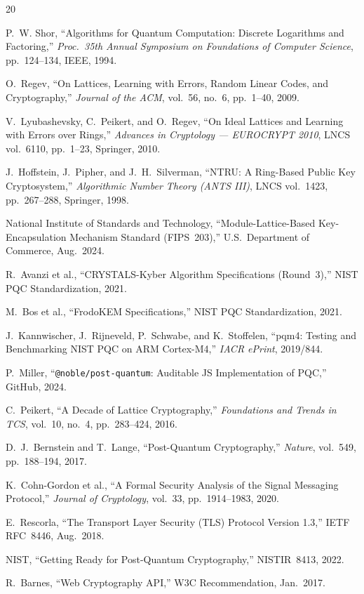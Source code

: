 \documentclass[12pt,a4paper]{report}
\begin{document}
\begin{thebibliography}{20}

P.~W. Shor, ``Algorithms for Quantum Computation: Discrete Logarithms and
Factoring,'' \textit{Proc.\ 35th Annual Symposium on Foundations of Computer
Science}, pp.~124--134, IEEE, 1994.

O.~Regev, ``On Lattices, Learning with Errors, Random Linear Codes, and
Cryptography,'' \textit{Journal of the ACM}, vol.~56, no.~6, pp.~1--40, 2009.

V.~Lyubashevsky, C.~Peikert, and O.~Regev, ``On Ideal Lattices and Learning with
Errors over Rings,'' \textit{Advances in Cryptology --- EUROCRYPT 2010},
LNCS vol.~6110, pp.~1--23, Springer, 2010.

J.~Hoffstein, J.~Pipher, and J.~H.~Silverman, ``NTRU: A Ring-Based Public Key
Cryptosystem,'' \textit{Algorithmic Number Theory (ANTS III)}, LNCS vol.~1423,
pp.~267--288, Springer, 1998.

National Institute of Standards and Technology, ``Module-Lattice-Based
Key-Encapsulation Mechanism Standard (FIPS~203),'' U.S.\ Department of Commerce,
Aug.~2024.

R.~Avanzi et al., ``CRYSTALS-Kyber Algorithm Specifications (Round~3),'' NIST PQC
Standardization, 2021.

M.~Bos et al., ``FrodoKEM Specifications,'' NIST PQC Standardization, 2021.

J.~Kannwischer, J.~Rijneveld, P.~Schwabe, and K.~Stoffelen, ``pqm4: Testing and
Benchmarking NIST PQC on ARM Cortex-M4,'' \textit{IACR ePrint}, 2019/844.

P.~Miller, ``\texttt{@noble/post-quantum}: Auditable JS Implementation of PQC,''
GitHub, 2024.

C.~Peikert, ``A Decade of Lattice Cryptography,'' \textit{Foundations and Trends
in TCS}, vol.~10, no.~4, pp.~283--424, 2016.

D.~J.~Bernstein and T.~Lange, ``Post-Quantum Cryptography,'' \textit{Nature},
vol.~549, pp.~188--194, 2017.

K.~Cohn-Gordon et al., ``A Formal Security Analysis of the Signal Messaging
Protocol,'' \textit{Journal of Cryptology}, vol.~33, pp.~1914--1983, 2020.

E.~Rescorla, ``The Transport Layer Security (TLS) Protocol Version 1.3,''
IETF RFC~8446, Aug.~2018.

NIST, ``Getting Ready for Post-Quantum Cryptography,'' NISTIR~8413, 2022.

R.~Barnes, ``Web Cryptography API,'' W3C Recommendation, Jan.~2017.

\end{thebibliography}
\end{document}
